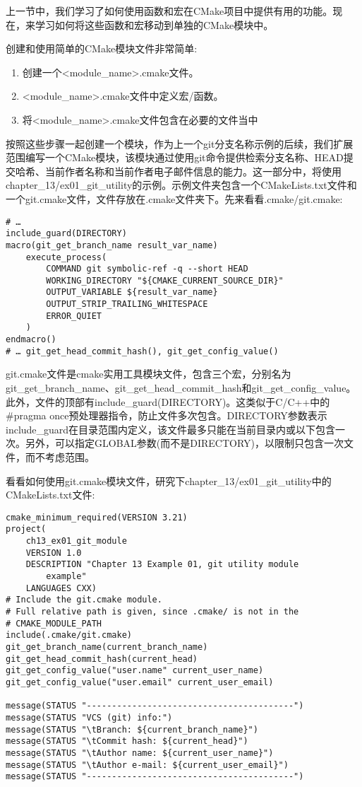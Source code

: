 
上一节中，我们学习了如何使用函数和宏在CMake项目中提供有用的功能。现在，来学习如何将这些函数和宏移动到单独的CMake模块中。

创建和使用简单的CMake模块文件非常简单:

\begin{enumerate}
\item 
创建一个<module\_name>.cmake文件。

\item 
<module\_name>.cmake文件中定义宏/函数。

\item 
将<module\_name>.cmake文件包含在必要的文件当中
\end{enumerate}

按照这些步骤一起创建一个模块，作为上一个git分支名称示例的后续，我们扩展范围编写一个CMake模块，该模块通过使用git命令提供检索分支名称、HEAD提交哈希、当前作者名称和当前作者电子邮件信息的能力。这一部分中，将使用chapter\_13/ex01\_git\_utility的示例。示例文件夹包含一个CMakeLists.txt文件和一个git.cmake文件，文件存放在.cmake文件夹下。先来看看.cmake/git.cmake:

\begin{lstlisting}[style=styleCMake]
# …
include_guard(DIRECTORY)
macro(git_get_branch_name result_var_name)
	execute_process(
		COMMAND git symbolic-ref -q --short HEAD
		WORKING_DIRECTORY "${CMAKE_CURRENT_SOURCE_DIR}"
		OUTPUT_VARIABLE ${result_var_name}
		OUTPUT_STRIP_TRAILING_WHITESPACE
		ERROR_QUIET
	)
endmacro()
# … git_get_head_commit_hash(), git_get_config_value()
\end{lstlisting}

git.cmake文件是cmake实用工具模块文件，包含三个宏，分别名为git\_get\_branch\_name、git\_get\_head\_commit\_hash和git\_get\_config\_value。此外，文件的顶部有include\_guard(DIRECTORY)。这类似于C/C++中的\#pragma once预处理器指令，防止文件多次包含。DIRECTORY参数表示include\_guard在目录范围内定义，该文件最多只能在当前目录内或以下包含一次。另外，可以指定GLOBAL参数(而不是DIRECTORY)，以限制只包含一次文件，而不考虑范围。

看看如何使用git.cmake模块文件，研究下chapter\_13/ex01\_git\_utility中的CMakeLists.txt文件:

\begin{lstlisting}[style=styleCMake]
cmake_minimum_required(VERSION 3.21)
project(
	ch13_ex01_git_module
	VERSION 1.0
	DESCRIPTION "Chapter 13 Example 01, git utility module
		example"
	LANGUAGES CXX)
# Include the git.cmake module.
# Full relative path is given, since .cmake/ is not in the 
# CMAKE_MODULE_PATH
include(.cmake/git.cmake)
git_get_branch_name(current_branch_name)
git_get_head_commit_hash(current_head)
git_get_config_value("user.name" current_user_name)
git_get_config_value("user.email" current_user_email)

message(STATUS "-----------------------------------------")
message(STATUS "VCS (git) info:")
message(STATUS "\tBranch: ${current_branch_name}")
message(STATUS "\tCommit hash: ${current_head}")
message(STATUS "\tAuthor name: ${current_user_name}")
message(STATUS "\tAuthor e-mail: ${current_user_email}")
message(STATUS "-----------------------------------------")
\end{lstlisting}

